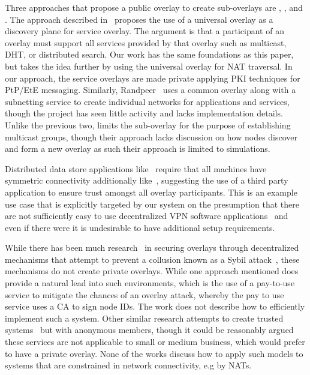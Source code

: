 \documentclass[conference]{IEEEtran}
\begin{document}
Three approaches that propose a public overlay to create sub-overlays are
\cite{one_ring}, \cite{randpeer}, and \cite{can_multicast}.
The approach described in~\cite{one_ring} proposes the use of a universal overlay as a discovery plane for
service overlay.  The argument is that a participant of an overlay
must support all services provided by that overlay such as multicast, DHT,
or distributed search.  Our work has the same foundations as this paper, but
takes the idea further by using the universal overlay for NAT traversal.
In our approach, the service overlays are made private applying PKI techniques for PtP/EtE messaging.
Similarly, Randpeer~\cite{randpeer} uses a common overlay along with a
subnetting service to create individual networks for applications and services,
though the project has seen little activity and lacks implementation details.
Unlike the previous two, \cite{can_multicast} limits the sub-overlay for the
purpose of establishing multicast groups, though their approach lacks discussion
on how nodes discover and form a new overlay as such their approach is limited
to simulations.

Distributed data store applications like~\cite{dynamo, bigtable} require that
all machines have symmetric connectivity additionally like~\cite{past}, suggesting
the use of a third party application to ensure trust amongst all overlay
participants.  This is an example use case that is explicitly targeted by our
system on the presumption that there are not sufficiently easy to use
decentralized VPN software applications~\cite{sc09, nsdi10} and even if there
were it is undesirable to have additional setup requirements.

While there has been much research~\cite{secure_routing} in securing overlays
through decentralized mechanisms that attempt to prevent a collusion known as
a Sybil attack~\cite{sybil}, these mechanisms do not create private overlays.
While one approach mentioned does provide a natural lead into such
environments, which is the use of a pay-to-use service to mitigate the chances
of an overlay attack, whereby the pay to use service uses a CA to sign node
IDs.  The work does not describe how to efficiently implement such a system.
Other similar research attempts to create trusted systems~\cite{stone, tor} but
with anonymous members, though it could be reasonably argued these services are
not applicable to small or medium business, which would prefer to have a private
overlay.  None of the works discuss how to apply such models to
systems that are constrained in network connectivity, e.g by NATs.
\end{document}
